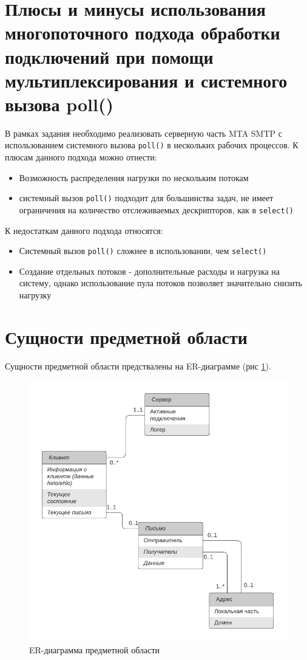 \documentclass[a4paper,12pt]{report}
\begin{document}
\section{Плюсы и минусы использования многопоточного подхода обработки подключений при помощи мультиплексирования и системного вызова poll()}

В рамках задания необходимо реализовать серверную часть MTA SMTP с использованием системного вызова \texttt{poll()} в нескольких рабочих процессов. К плюсам данного подхода можно отнести:
\begin{itemize}
    \item Возможность распределения нагрузки по нескольким потокам
    \item системный вызов \texttt{poll()} подходит для большинства задач, не имеет ограничения на количество отслеживаемых дескрипторов, как в \texttt{select()}
\end{itemize}

К недостаткам данного подхода относятся:
\begin{itemize}
    \item Системный вызов \texttt{poll()} сложнее в использовании, чем \texttt{select()}
    \item Создание отдельных потоков - дополнительные расходы и нагрузка на систему, однако использование пула потоков позволяет значительно снизить нагрузку
\end{itemize}

\section{Сущности предметной области}

Сущности предметной области предствалены на ER-диаграмме (рис \ref{fig:er}).

\begin{figure}
\centering
\includegraphics[width=\textwidth]{diagramms/er.pdf}
\caption{ER-диаграмма предметной области}
\label{fig:er}
\end{figure}
\end{document}
